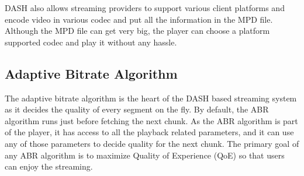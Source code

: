 DASH also allows streaming providers to support various client platforms and encode video in various codec and put all the information in the MPD file. Although the MPD file can get very big, the player can choose a platform supported codec and play it without any hassle.


\subsection{Adaptive Bitrate Algorithm}
The adaptive bitrate algorithm is the heart of the DASH based streaming system as it decides the quality of every segment on the fly. By default, the ABR algorithm runs just before fetching the next chunk. As the ABR algorithm is part of the player, it has access to all the playback related parameters, and it can use any of those parameters to decide quality for the next chunk. The primary goal of any ABR algorithm is to maximize Quality of Experience (QoE) so that users can enjoy the streaming.

